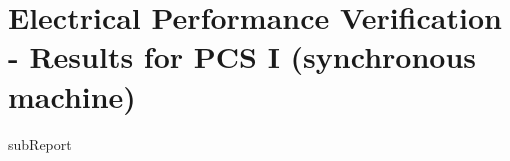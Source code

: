 \renewcommand{\DTRPcs}{I} %
\renewcommand{\DTRPcsLong}{I (synchronous machine)}


    \section{Electrical Performance Verification - Results for PCS \DTRPcsLong}

    {{subReport}}
    \newpage

